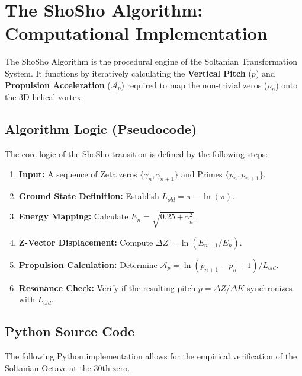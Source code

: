 \documentclass[11pt,a4paper]{article}
\begin{document}
\section{The ShoSho Algorithm: Computational Implementation}

The ShoSho Algorithm is the procedural engine of the Soltanian Transformation System. It functions by iteratively calculating the \textbf{Vertical Pitch} ($p$) and \textbf{Propulsion Acceleration} ($\mathcal{A}_p$) required to map the non-trivial zeros ($\rho_n$) onto the 3D helical vortex.

\subsection{Algorithm Logic (Pseudocode)}
The core logic of the ShoSho transition is defined by the following steps:

\begin{enumerate}
    \item \textbf{Input:} A sequence of Zeta zeros $\{\gamma_n, \gamma_{n+1}\}$ and Primes $\{p_n, p_{n+1}\}$.
    \item \textbf{Ground State Definition:} Establish $L_{old} = \pi - \ln(\pi)$.
    \item \textbf{Energy Mapping:} Calculate $E_n = \sqrt{0.25 + \gamma_n^2}$.
    \item \textbf{Z-Vector Displacement:} Compute $\Delta Z = \ln(E_{n+1} / E_n)$.
    \item \textbf{Propulsion Calculation:} Determine $\mathcal{A}_p = \ln(p_{n+1} - p_n + 1) / L_{old}$.
    \item \textbf{Resonance Check:} Verify if the resulting pitch $p = \Delta Z / \Delta K$ synchronizes with $L_{old}$.
\end{enumerate}

\subsection{Python Source Code}
The following Python implementation allows for the empirical verification of the Soltanian Octave at the 30th zero.
\end{document}
